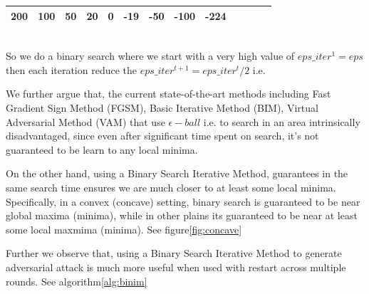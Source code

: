 \documentclass[letterpaper]{article}
\begin{document}
\begin{tabular}{|c|c|c|c|c|c|c|c|c|c|c|c|c|}
\hline
    200 & 100 & 50 & 20 & 0 & -19 & -50 & -100 & -224 \\
    \hline
\end{tabular}
\\

So we do a binary search where we start with a very high value of $eps\_iter^{1}= eps$ then each iteration reduce the $eps\_iter^{t+1} = eps\_iter^{t}/ 2$
i.e.

We further argue that, the current state-of-the-art methods including Fast  Gradient  Sign  Method (FGSM), Basic  Iterative  Method  (BIM), Virtual  Adversarial  Method  (VAM)  that use $ \epsilon -ball $ i.e. to search in an area intrinsically disadvantaged, since even after significant time spent on search, it's not guaranteed to be learn to any local minima.

On the other hand, using a Binary Search Iterative Method, guarantees in the same search time ensures we are much closer to at least some local minima. Specifically, in a convex (concave) setting, binary search is guaranteed to be near global maxima (minima), while in other plains its guaranteed to be near at least some local maxmima (minima). See figure\ref{fig:concave}

Further we observe that, using a Binary Search Iterative Method to generate adversarial attack is much more useful when used with restart across multiple rounds. See algorithm\ref{alg:binim}
\end{document}
